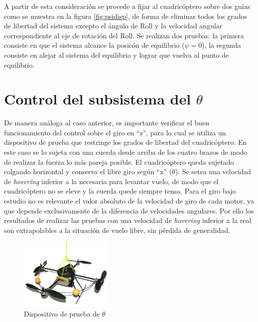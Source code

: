 \documentclass[main]{subfiles}
\begin{document}
A partir de esta consideraci\'on se procede a fijar al cuadric\'optero sobre dos gu\'ias como se muestra en la figura \ref{fig:psidisp}, de forma de eliminar todos los grados de libertad del sistema excepto el \'angulo de Roll y la velocidad angular correspondiente al eje de rotaci\'on del Roll. Se realizan dos pruebas: la primera consiste en que el sistema alcance la posic\'on de equilibrio ($\psi = 0$), la segunda consiste en alejar al sistema del equilibrio y lograr que vuelva al punto de equilibrio.

\section{Control del subsistema del $\theta$}

De manera análoga al caso anterior, es importante verificar el buen funcionamiento del control sobre el giro en ``z'', para lo cual se utiliza un dispositivo de prueba que restringe los grados de libertad del cuadricóptero. En este caso se lo sujeta con una cuerda desde arriba de los cuatro brazos de modo de realizar la fuerza lo más pareja posible. El cuadricóptero queda sujetado colgando horizontal y conserva el libre giro según ``x'' ($\theta$).
Se setea una velocidad de \emph{hovering} inferior a la necesaria para levantar vuelo, de modo que el cuadricóptero no se eleve y la cuerda quede siempre tensa. Para el giro bajo estudio no es relevante el valor absoluto de la velocidad de giro de cada motor, ya que depende exclusivamente de la diferencia de velocidades angulares. Por ello los resultados de realizar las pruebas con una velocidad de \emph{hovering} inferior a la real son extrapolables a la situación de vuelo libre, sin pérdida de generalidad.\\

\begin{figure}
	\vspace{-20pt}
	\centering
	\includegraphics[width=0.4\textwidth]{./pics_test_control/dispositivo_theta.pdf}
	\caption{Dispositivo de prueba de $\theta$}
	\label{fig:thetadisp}
\end{figure}
\end{document}
